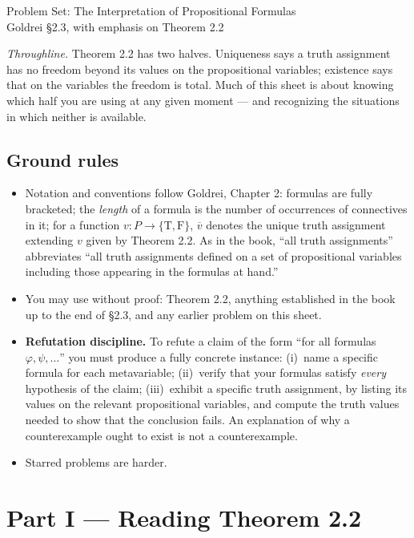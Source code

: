 \documentclass[11pt]{article}
\newcommand{\T}{\mathrm{T}}
\newcommand{\F}{\mathrm{F}}
\newcommand{\TF}{\{\T,\F\}}
\newcommand{\ext}[1]{\overline{#1}}
\theoremstyle{definition}
\begin{document}
\begin{center}
{\LARGE Problem Set: The Interpretation of Propositional Formulas}\\[4pt]
{\large Goldrei \S 2.3, with emphasis on Theorem 2.2}
\end{center}

\bigskip

\noindent\emph{Throughline.} Theorem 2.2 has two halves. Uniqueness says a truth
assignment has no freedom beyond its values on the propositional variables;
existence says that on the variables the freedom is total. Much of this sheet is
about knowing which half you are using at any given moment --- and recognizing the
situations in which neither is available.

\subsection*{Ground rules}

\begin{itemize}
\item Notation and conventions follow Goldrei, Chapter 2: formulas are fully
bracketed; the \emph{length} of a formula is the number of occurrences of
connectives in it; for a function $v\colon P\to\TF$, $\ext{v}$ denotes the unique
truth assignment extending $v$ given by Theorem 2.2. As in the book, ``all truth
assignments'' abbreviates ``all truth assignments defined on a set of
propositional variables including those appearing in the formulas at hand.''
\item You may use without proof: Theorem 2.2, anything established in the book up
to the end of \S 2.3, and any earlier problem on this sheet.
\item \textbf{Refutation discipline.} To refute a claim of the form ``for all
formulas $\varphi,\psi,\dots$'' you must produce a fully concrete instance:
(i)~name a specific formula for each metavariable; (ii)~verify that your formulas
satisfy \emph{every} hypothesis of the claim; (iii)~exhibit a specific truth
assignment, by listing its values on the relevant propositional variables, and
compute the truth values needed to show that the conclusion fails. An explanation
of why a counterexample ought to exist is not a counterexample.
\item Starred problems are harder.
\end{itemize}

\section*{Part I --- Reading Theorem 2.2}
\end{document}
